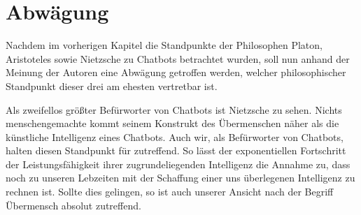 \section{Abwägung}

Nachdem im vorherigen Kapitel die Standpunkte der Philosophen Platon, Aristoteles sowie Nietzsche zu Chatbots betrachtet wurden, soll nun anhand der Meinung der Autoren eine Abwägung getroffen werden, welcher philosophischer Standpunkt dieser drei am ehesten vertretbar ist.

Als zweifellos größter Befürworter von Chatbots ist Nietzsche zu sehen.
Nichts menschengemachte kommt seinem Konstrukt des Übermenschen näher als die künstliche Intelligenz eines Chatbots.
Auch wir, als Befürworter von Chatbots, halten diesen Standpunkt für zutreffend.
So lässt der exponentiellen Fortschritt der Leistungsfähigkeit ihrer zugrundeliegenden Intelligenz die Annahme zu, dass noch zu unseren Lebzeiten mit der Schaffung einer uns überlegenen Intelligenz zu rechnen ist.
Sollte dies gelingen, so ist auch unserer Ansicht nach der Begriff Übermensch absolut zutreffend.